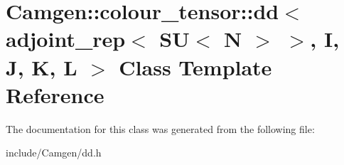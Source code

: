 \hypertarget{a00120}{\section{Camgen\-:\-:colour\-\_\-tensor\-:\-:dd$<$ adjoint\-\_\-rep$<$ S\-U$<$ N $>$ $>$, I, J, K, L $>$ Class Template Reference}
\label{a00120}
}


The documentation for this class was generated from the following file\-:\begin{DoxyCompactItemize}
\item 
include/\-Camgen/dd.\-h\end{DoxyCompactItemize}
